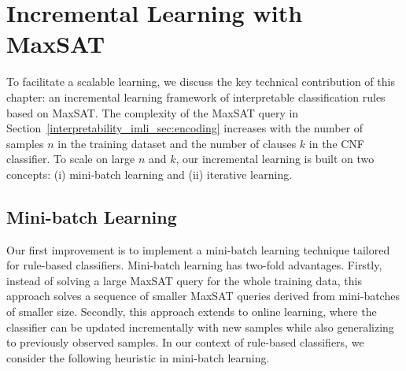 \section{Incremental Learning with MaxSAT}
\label{interpretability_imli_sec:incremental_learning} 
To facilitate a scalable learning, we discuss the key technical contribution of this chapter: an incremental learning framework of interpretable classification rules based on MaxSAT. The complexity of the MaxSAT query in Section~\ref{interpretability_imli_sec:encoding} increases with the number of samples $ n $ in the training dataset and the number of clauses $ k $  in the CNF classifier. To scale on large $ n $ and $ k $, our incremental learning is built on two concepts: (i) mini-batch learning and (ii) iterative learning. 

\subsection{Mini-batch Learning} 

Our first improvement is to implement a mini-batch learning technique tailored for rule-based classifiers. Mini-batch learning has two-fold advantages. Firstly, instead of solving a large MaxSAT query for the whole training data, this approach solves a sequence of smaller MaxSAT queries derived from mini-batches of smaller size.  Secondly, this approach extends to online learning, where the classifier can be updated incrementally with new samples while also generalizing to previously observed samples. In our context of rule-based classifiers, we consider the following heuristic in mini-batch learning.


